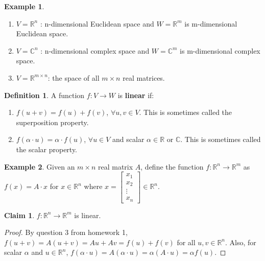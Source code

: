 \documentclass[12pt]{article}
\theoremstyle{definition}
\newtheorem*{definition}{Definition}
\newtheorem*{example}{Example}
\newtheorem*{claim}{Claim}
\begin{document}
\begin{example}

\begin{enumerate}
\item $V = \mathbb{R}^n$ : n-dimensional Euclidean space and $W = \mathbb{R}^m$ is m-dimensional Euclidean space.
\item $V = \mathbb{C}^n$ : n-dimensional complex space and $W = \mathbb{C}^m$ is m-dimensional complex space.
\item $V = \mathbb{R}^{m \times n}$: the space of all $m \times n$ real matrices.
\end{enumerate}
\end{example}

\begin{definition}
A function $f : V \rightarrow W$ is \textbf{linear} if:
\begin{enumerate}
\item $f(u + v) = f(u) + f(v)$, $\forall u, v \in V$. This is sometimes called the superposition property.
\item $f(\alpha \cdot u) = \alpha \cdot f(u)$, $\forall u \in V$ and scalar 
$\alpha \in \mathbb{R} \text{ or } \mathbb{C}$. This is sometimes called the scalar property.
\end{enumerate}
\end{definition}

\begin{example}
Given an $m \times n$ real matrix $A$, define the function $f : \mathbb{R}^n \rightarrow \mathbb{R}^m$ as
$f(x) = A \cdot x$ for $x \in \mathbb{R}^n$ where $x = \begin{bmatrix} x_1 \\ x_2 \\ \vdots \\ x_n \end{bmatrix} \in \mathbb{R}^n$.

\begin{claim}
$f : \mathbb{R}^n \rightarrow \mathbb{R}^m$ is linear.
\end{claim}

\begin{proof}
By question 3 from homework 1,
$f( u + v ) = A (u + v) = Au + Av = f(u) + f(v)$ for all $u, v \in \mathbb{R}^n$. Also, for scalar $\alpha$ and
$u \in \mathbb{R}^n$, $f(\alpha \cdot u) = A ( \alpha \cdot u ) = \alpha (A \cdot u) = \alpha f(u)$.
\end{proof}

\end{example}
\end{document}
